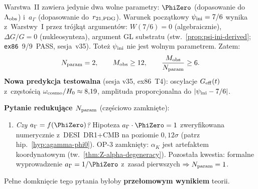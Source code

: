 \begin{remark}%
\label{rem:parsimony}
Warstwa~II zawiera jedynie dwa wolne parametry:
$\PhiZero$ (dopasowanie do~$\Lambda_{\rm obs}$) i~$a_\Gamma$
(dopasowanie do~$r_{21,\rm PDG}$).
Warunek pocz\k{a}tkowy $\psi_{\rm ini} = 7/6$ wynika z~Warstwy~I
przez tr\'ojk\k{a}t argument\'ow: $W(7/6)=0$ (algebraicznie),
$\Delta G/G = 0$ (nukleosynteza), argument GL substratu
(stw.~\ref{prop:psi-ini-derived}; \texttt{ex86}~9/9~PASS, sesja~v35).
Tote\.z $\psi_{\rm ini}$ nie jest wolnym parametrem.
Zatem:
\begin{equation}\label{eq:parsimony-N2}
  N_{\rm param} = 2,
  \qquad
  M_{\rm obs} \geq 12,
  \qquad
  \frac{M_{\rm obs}}{N_{\rm param}} \geq 6.
\end{equation}
\textbf{Nowa predykcja testowalna} (sesja v35, ex86~T4):
oscylacje $G_{\rm eff}(t)$ z~cz\k{e}sto\'sci\k{a}
$\omega_{\rm cosmo}/H_0 \approx 8{,}19$, amplituda
proporcjonalna do $|\psi_{\rm ini} - 7/6|$.

\medskip\noindent
\textbf{Pytanie redukuj\k{a}ce $N_{\rm param}$} (cz\k{e}\'sciowo zamkni\k{e}te):
\begin{enumerate}[nosep]
  \item \emph{Czy $a_\Gamma = f(\PhiZero)$?}
    Hipoteza $a_\Gamma \cdot \PhiZero = 1$ zweryfikowana numerycznie
    z~DESI~DR1+CMB na poziomie $0{,}12\sigma$ (patrz hip.~\ref{hyp:agamma-phi0}).
    OP-3 zamkni\k{e}ty: $\alpha_K$ jest artefaktem koordynatowym
    (tw.~\ref{thm:Z-alpha-degeneracy}).
    Pozosta\l{}a kwestia: formalne wyprowadzenie $a_\Gamma = 1/\PhiZero$
    z~zasad pierwszych $\Rightarrow N_{\rm param} = 1$.
\end{enumerate}
Pe\l{}ne domkni\k{e}cie tego pytania by\l{}oby
\textbf{prze\l{}omowym wynikiem} teorii.
\end{remark}

